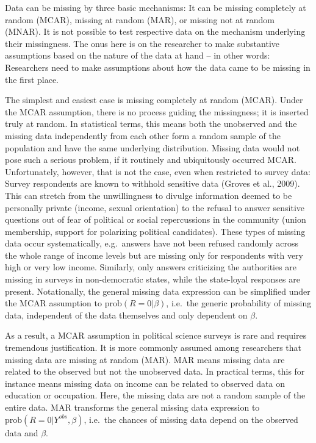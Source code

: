 \documentclass[12pt,econ]{sources/authesis}
\begin{document}
Data can be missing by three basic mechanisms: It can be missing completely at random (MCAR), missing at random (MAR), or missing not at random (MNAR). It is not possible to test respective data on the mechanism underlying their missingness. The onus here is on the researcher to make substantive assumptions based on the nature of the data at hand -- in other words: Researchers need to make assumptions about how the data came to be missing in the first place.

The simplest and easiest case is missing completely at random (MCAR). Under the MCAR assumption, there is no process guiding the missingness; it is inserted truly at random. In statistical terms, this means both the unobserved and the missing data independently from each other form a random sample of the population and have the same underlying distribution. Missing data would not pose such a serious problem, if it routinely and ubiquitously occurred MCAR. Unfortunately, however, that is not the case, even when restricted to survey data: Survey respondents are known to withhold sensitive data (Groves et al., 2009). This can stretch from the unwillingness to divulge information deemed to be personally private (income, sexual orientation) to the refusal to answer sensitive questions out of fear of political or social repercussions in the community (union membership, support for polarizing political candidates). These types of missing data occur systematically, e.g.~answers have not been refused randomly across the whole range of income levels but are missing only for respondents with very high or very low income. Similarly, only answers criticizing the authorities are missing in surveys in non-democratic states, while the state-loyal responses are present. Notationally, the general missing data expression can be simplified under the MCAR assumption to \(\text{prob}(R = 0 | \beta)\), i.e.~the generic probability of missing data, independent of the data themselves and only dependent on \(\beta\).

As a result, a MCAR assumption in political science surveys is rare and requires tremendous justification. It is more commonly assumed among researchers that missing data are missing at random (MAR). MAR means missing data are related to the observed but not the unobserved data. In practical terms, this for instance means missing data on income can be related to observed data on education or occupation. Here, the missing data are not a random sample of the entire data. MAR transforms the general missing data expression to \(\text{prob}(R = 0 | Y^{obs}, \beta)\), i.e.~the chances of missing data depend on the observed data and \(\beta\).
\end{document}
